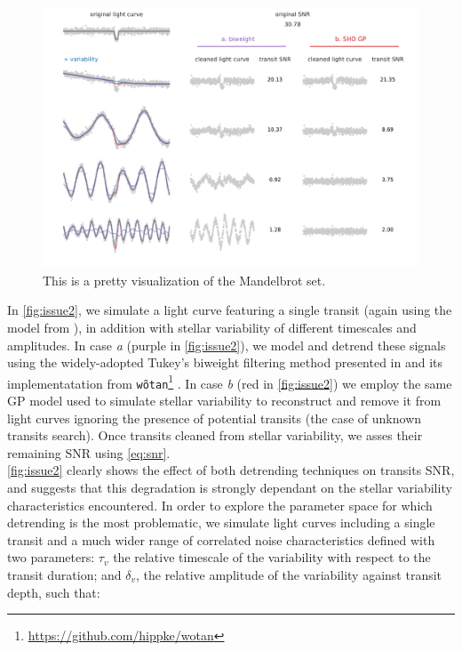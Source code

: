 \documentclass{aastex631}
\begin{document}
\begin{figure}[H]
    \begin{centering}
        \includegraphics[width=\linewidth]{../figures/issue2.pdf}
        \caption{This is a pretty visualization of the Mandelbrot set.}
        \label{fig:issue2}
    \end{centering}
\end{figure}

In \autoref{fig:issue2}, we simulate a light curve featuring a single transit (again using the model from \citealt{protopapas}), in addition with stellar variability of different timescales and amplitudes. In case \textit{a} (purple in \autoref{fig:issue2}), we model and detrend these signals using the widely-adopted Tukey's biweight filtering method presented in \citealt{tukey} and its implementatation from \texttt{wõtan}\footnote{\href{https://github.com/hippke/wotan}{https://github.com/hippke/wotan}} \citep{wotan}. In case \textit{b} (red in \autoref{fig:issue2}) we employ the same GP model used to simulate stellar variability to reconstruct and remove it from light curves ignoring the presence of potential transits (the case of unknown transits search). Once transits cleaned from stellar variability, we asses their remaining SNR using \autoref{eq:snr}.
\bigskip\\
\autoref{fig:issue2} clearly shows the effect of both detrending techniques on transits SNR, and suggests that this degradation is strongly dependant on the stellar variability characteristics encountered. In order to explore the parameter space for which detrending is the most problematic, we simulate light curves including a single transit and a much wider range of correlated noise characteristics defined with two parameters: $\tau_v$ the relative timescale of the variability with respect to the transit duration; and $\delta_v$, the relative amplitude of the variability against transit depth, such that:
\end{document}
